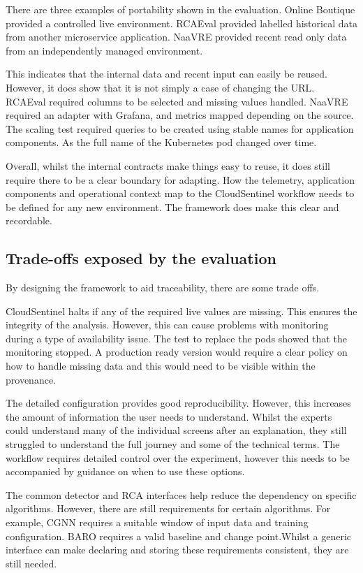 There are three examples of portability shown in the evaluation. Online Boutique provided a controlled live environment. RCAEval provided labelled historical data from another microservice application. NaaVRE provided recent read only data from an independently managed environment.

This indicates that the internal data and recent input can easily be reused. However, it does show that it is not simply a case of changing the URL. RCAEval required columns to be selected and missing values handled. NaaVRE required an adapter with Grafana, and metrics mapped depending on the source. The scaling test required queries to be created using stable names for application components. As the full name of the Kubernetes pod changed over time.

Overall, whilst the internal contracts make things easy to reuse, it does still require there to be a clear boundary for adapting. How the telemetry, application components and operational context map to the CloudSentinel workflow needs to be defined for any new environment. The framework does make this clear and recordable.

\subsection{Trade-offs exposed by the evaluation}

By designing the framework to aid traceability, there are some trade offs.

CloudSentinel halts if any of the required live values are missing. This ensures the integrity of the analysis. However, this can cause problems with monitoring during a type of availability issue. The test to replace the pods showed that the monitoring stopped. A production ready version would require a clear policy on how to handle missing data and this would need to be visible within the provenance.

The detailed configuration provides good reproducibility. However, this increases the amount of information the user needs to understand. Whilst the experts could understand many of the individual screens after an explanation, they still struggled to understand the full journey and some of the technical terms. The workflow requires detailed control over the experiment, however this needs to be accompanied by guidance on when to use these options.

The common detector and RCA interfaces help reduce the dependency on specific algorithms. However, there are still requirements for certain algorithms. For example, CGNN requires a suitable window of input data and training configuration. BARO requires a valid baseline and change point.Whilst a generic interface can make declaring and storing these requirements consistent, they are still needed.

